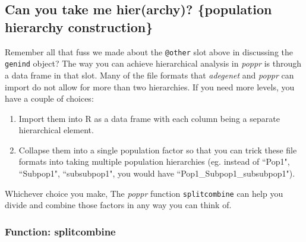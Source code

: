 \documentclass[letterpaper]{article}
\newcommand{\tab}{\hspace*{1em}}
\begin{document}
\subsection{Can you take me hier(archy)? \{population hierarchy construction\}}

\tab\tab Remember all that fuss we made about the \texttt{@other} slot above in discussing the \texttt{genind} object? The way you can achieve hierarchical analysis in \textit{poppr} is through a data frame in that slot. Many of the file formats that \textit{adegenet} and \textit{poppr} can import do not allow for more than two hierarchies. If you need more levels, you have a couple of choices: 
\begin{enumerate}
  \item Import them into R as a data frame with each column being a separate hierarchical element.
  \item Collapse them into a single population factor so that you can trick these file formats into taking multiple population hierarchies (eg. instead of ``Pop1", ``Subpop1", ``subsubpop1", you would have ``Pop1\_Subpop1\_subsubpop1"). 
\end{enumerate}
Whichever choice you make, The \textit{poppr} function \texttt{splitcombine} can help you divide and combine those factors in any way you can think of.
\subsubsection{Function: splitcombine}
\end{document}

